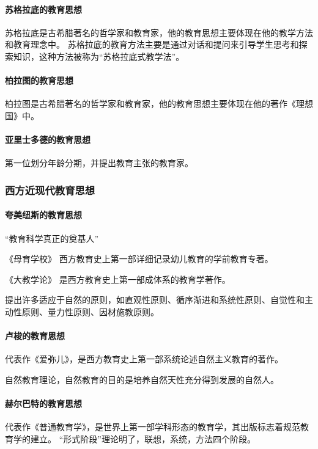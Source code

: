 \documentclass[b5paper,11pt]{article}
\begin{document}
\paragraph{苏格拉底的教育思想} 苏格拉底是古希腊著名的哲学家和教育家，他的教育思想主要体现在他的教学方法和教育理念中。
\textcolor{ctp-red}{苏格拉底的教育方法主要是通过对话和提问来引导学生思考和探索知识，这种方法被称为“苏格拉底式教学法”。}

\paragraph{柏拉图的教育思想} 柏拉图是古希腊著名的哲学家和教育家，他的教育思想主要体现在他的著作\textcolor{ctp-red}{《理想国》}中。
\paragraph{亚里士多德的教育思想} 第一位划分年龄分期，并提出教育主张的教育家。

\subsubsection{西方近现代教育思想}
\paragraph{夸美纽斯的教育思想} “教育科学真正的奠基人”

\textcolor{ctp-red}{《母育学校》} 西方教育史上第一部详细记录幼儿教育的学前教育专著。

\textcolor{ctp-red}{《大教学论》} 是西方教育史上第一部成体系的教育学著作。

提出许多适应于自然的原则，如直观性原则、循序渐进和系统性原则、自觉性和主动性原则、量力性原则、因材施教原则。

\paragraph{卢梭的教育思想} 代表作\textcolor{ctp-red}{《爱弥儿》}，是西方教育史上第一部系统论述自然主义教育的著作。

\textcolor{ctp-red}{自然教育理论}，自然教育的目的是培养自然天性充分得到发展的\textcolor{ctp-red}{自然人}。

\paragraph{赫尔巴特的教育思想} 代表作\textcolor{ctp-red}{《普通教育学》}，是世界上第一部学科形态的教育学，其出版标志着规范教育学的建立。
“形式阶段”理论\textcolor{ctp-red}{明了，联想，系统，方法}四个阶段。
\end{document}
